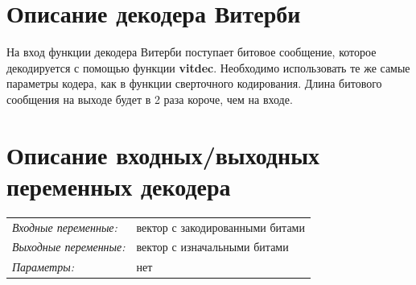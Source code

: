 \section{Описание декодера Витерби}

На вход функции декодера Витерби поступает битовое сообщение, которое 
декодируется с помощью функции \textbf{vitdec}. Необходимо использовать те же самые 
параметры кодера, как в функции сверточного кодирования. Длина битового 
сообщения на выходе будет в 2 раза короче, чем на входе.
\section{Описание входных/выходных переменных декодера}
\bigskip

               
\begin{tabular}{@{}p{6cm}p{8cm}@{}}
\textit{Входные переменные:} & вектор с закодированными битами \\
\textit{Выходные переменные:} & вектор с изначальными битами \\
\textit{Параметры:} & нет \\
\end{tabular}

\endinput